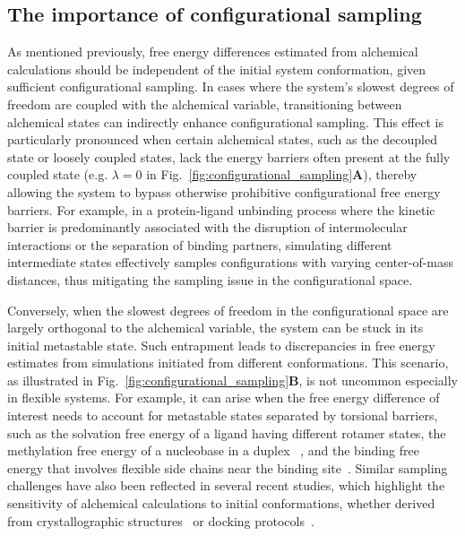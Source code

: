 \documentclass[9pt,bestpractices]{livecoms}
\begin{document}
\subsection{The importance of configurational sampling}
\label{sec:configurational_sampling}
As mentioned previously, free energy differences estimated from alchemical calculations should be independent of the initial system conformation, given sufficient configurational sampling. In cases where the system's slowest degrees of freedom are coupled with the alchemical variable, transitioning between alchemical states can indirectly enhance configurational sampling. This effect is particularly pronounced when certain alchemical states, such as the decoupled state or loosely coupled states, lack the energy barriers often present at the fully coupled state (e.g. $\lambda=0$ in Fig.~\ref{fig:configurational_sampling}\textbf{A}), thereby allowing the system to bypass otherwise prohibitive configurational free energy barriers. For example, in a protein-ligand unbinding process where the kinetic barrier is predominantly associated with the disruption of intermolecular interactions or the separation of binding partners, simulating different intermediate states effectively samples configurations with varying center-of-mass distances, thus mitigating the sampling issue in the configurational space. 

Conversely, when the slowest degrees of freedom in the configurational space are largely orthogonal to the alchemical variable, the system can be stuck in its initial metastable state. Such entrapment leads to discrepancies in free energy estimates from simulations initiated from different conformations. This scenario, as illustrated in Fig.~\ref{fig:configurational_sampling}\textbf{B}, is not uncommon especially in flexible systems. For example, it can arise when the free energy difference of interest needs to account for metastable states separated by torsional barriers, such as the solvation free energy of a ligand having different rotamer states, the methylation free energy of a nucleobase in a duplex ~\cite{hsu2023alchemical}, and the binding free energy that involves flexible side chains near the binding site~\cite{la2022alchemical}. Similar sampling challenges have also been reflected in several recent studies, which highlight the sensitivity of alchemical calculations to initial conformations, whether derived from crystallographic structures~\cite{suruzhon2021sensitivity, baumann2024impact} or docking protocols~\cite{cappel2020impact}. 
\end{document}
